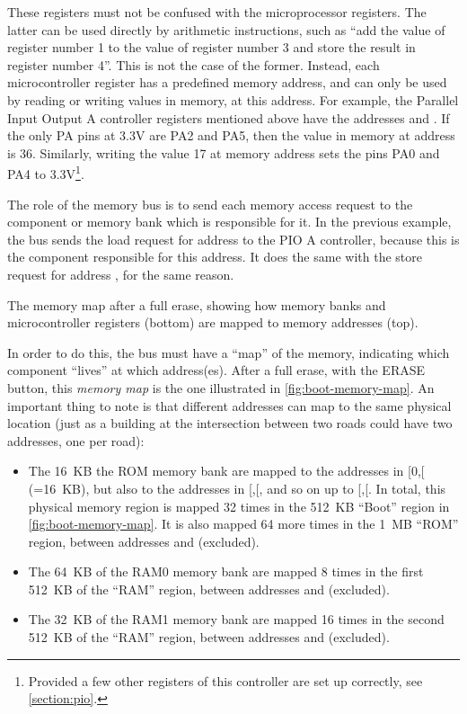 These registers must not be confused with the microprocessor registers. The
latter can be used directly by arithmetic instructions, such as ``add the value
of register number 1 to the value of register number 3 and store the result in
register number 4''. This is not the case of the former. Instead, each
microcontroller register has a predefined memory address, and can only be used
by reading or writing values in memory, at this address. For example, the
Parallel Input Output A controller registers mentioned above have the addresses
 and . If the only PA pins at 3.3V are PA2
and PA5, then the value in memory at address  is 36.
Similarly, writing the value 17 at memory address  sets the
pins PA0 and PA4 to 3.3V\footnote{Provided a few other registers of this
controller are set up correctly, see \cref{section:pio}.}.

The role of the memory bus is to send each memory access request to the
component or memory bank which is responsible for it. In the previous example,
the bus sends the load request for address  to the PIO A
controller, because this is the component responsible for this address. It does
the same with the store request for address , for the same
reason.

\begin{Figure}
  
  \caption{The memory map after a full erase, showing how memory banks and
  microcontroller registers (bottom) are mapped to memory addresses
  (top).}\label{fig:boot-memory-map}
\end{Figure}

In order to do this, the bus must have a ``map'' of the memory, indicating
which component ``lives'' at which address(es). After a full erase, with the
ERASE button, this {\em memory map} is the one illustrated in
\cref{fig:boot-memory-map}. An important thing to note is that different
addresses can map to the same physical location (just as a building at the
intersection between two roads could have two addresses, one per road):
\begin{itemize}
  \item The 16~KB the ROM memory bank are mapped to the addresses in
  [0,[ (=16~KB), but also to the addresses in
  [,[, and so on up to [,[. In
  total, this physical memory region is mapped 32 times in the 512~KB ``Boot''
  region in \cref{fig:boot-memory-map}. It is also mapped 64 more times in the
  1~MB ``ROM'' region, between addresses  and 
  (excluded).

  \item The 64~KB of the RAM0 memory bank are mapped 8 times in the first 512~KB
  of the ``RAM'' region, between addresses  and 
  (excluded).

  \item The 32~KB of the RAM1 memory bank are mapped 16 times in the second
  512~KB of the ``RAM'' region, between addresses  and
   (excluded).
\end{itemize}

